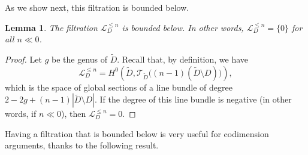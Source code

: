 \documentclass[12pt]{amsart}
\theoremstyle{plain}
\newtheorem{lemma}[theorem]{Lemma}
\theoremstyle{definition}
\numberwithin{equation}{section}
\def\L{\mathcal{L}}
\def\T{\mathcal{T}}
\begin{document}
As we show next, this filtration is bounded below.

\begin{lemma}
    The filtration $\L_D^{\leq n}$ is bounded below. In other words, $\L_D^{\leq n} = \{0\}$ for all $n \ll 0$.
\end{lemma}
\begin{proof}
    Let $g$ be the genus of $\widetilde{D}$. Recall that, by definition, we have
    $$\L_D^{\leq n} = H^0\left(\widetilde{D},\T_{\widetilde{D}}\big((n-1)(\widetilde{D} \setminus D)\big)\right),$$
    which is the space of global sections of a line bundle of degree $2 - 2g + (n - 1)|\widetilde{D}\setminus D|$. If the degree of this line bundle is negative (in other words, if $n \ll 0$), then $\L_D^{\leq n} = 0$.
\end{proof}

Having a filtration that is bounded below is very useful for codimension arguments, thanks to the following result.
\end{document}
